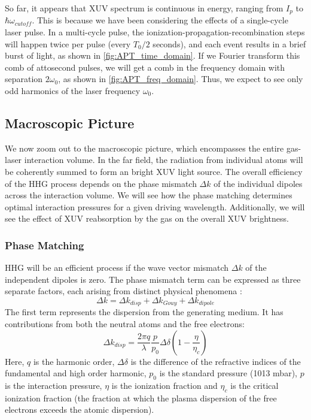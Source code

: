 So far, it appears that XUV spectrum is continuous in energy, ranging from $I_p$ to $\hbar \omega_{cutoff}$. This is because we have been considering the effects of a single-cycle laser pulse. In a multi-cycle pulse, the ionization-propagation-recombination steps will happen twice per pulse (every $T_0/2$ seconds), and each event results in a brief burst of light, as shown in \cref{fig:APT_time_domain}. If we Fourier transform this comb of attosecond pulses, we will get a comb in the frequency domain with separation $2 \omega_0$, as shown in \cref{fig:APT_freq_domain}. Thus, we expect to see only odd harmonics of the laser frequency $\omega_0$.

\subsection{Macroscopic Picture}

We now zoom out to the macroscopic picture, which encompasses the entire gas-laser interaction volume. In the far field, the radiation from individual atoms will be coherently summed to form an bright XUV light source. The overall efficiency of the HHG process depends on the phase mismatch $\Delta k$ of the individual dipoles across the interaction volume. We will see how the phase matching determines optimal interaction pressures for a given driving wavelength. Additionally, we will see the effect of XUV reabsorption by the gas on the overall XUV brightness.

\subsubsection{Phase Matching}

HHG will be an efficient process if the wave vector mismatch $\Delta k$ of the independent dipoles is zero. The phase mismatch term can be expressed as three separate factors, each arising from distinct physical phenomena \cite{rothhardtAbsorptionlimitedPhasematchedHigh2014}:
\begin{equation}
\Delta k = \Delta k_{disp} + \Delta k_{Gouy} + \Delta k_{dipole}
\label{eqn:phase_mismatch}
\end{equation}
The first term represents the dispersion from the generating medium. It has contributions from both the neutral atoms and the free electrons:
\begin{equation}
\Delta k_{disp} = \frac{2 \pi q}{\lambda} \frac{p}{p_0} \Delta \delta \left( 1 - \frac{\eta}{\eta_c} \right)
\end{equation}
Here, $q$ is the harmonic order, $\Delta \delta$ is the difference of the refractive indices of the fundamental and high order harmonic, $p_0$ is the standard pressure (1013 mbar), $p$ is the interaction pressure, $\eta$ is the ionization fraction and $\eta_c$ is the critical ionization fraction (the fraction at which the plasma dispersion of the free electrons exceeds the atomic dispersion).


